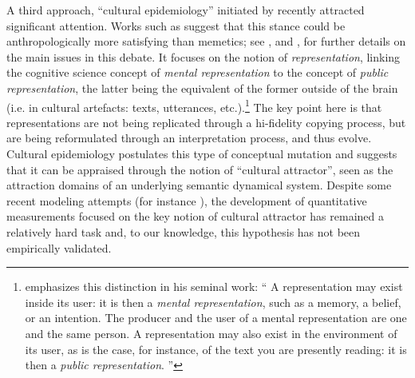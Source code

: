 A third approach, ``cultural epidemiology'' initiated by \citet{sper:expl} recently attracted significant attention. Works such as \citet{Atran03} suggest that this stance could be anthropologically more satisfying than memetics; see \citet{Kuper00}, and \citet{Bloch00}, for further details on the main issues in this debate.
It focuses on the notion of \emph{representation}, linking the cognitive science concept of \emph{mental representation} to the concept of \emph{public representation}, the latter being the equivalent of the former outside of the brain (\hbox{i.e.} in cultural artefacts: texts, utterances, etc.).\footnote{\citet{sper:expl} emphasizes this distinction in his seminal work:
{%
``%
A representation may exist inside its user: it is then a \emph{mental representation}, such as a memory, a belief, or an intention. The producer and the user of a mental representation are one and the same person.  A representation may also exist in the environment of its user, as is the case, for instance, of the text you are presently reading: it is then a \emph{public representation}.}%
''
}
The key point here is that representations are not being replicated through a hi-fidelity copying process, but are being reformulated through an interpretation process, and thus evolve. Cultural epidemiology postulates this type of conceptual mutation and suggests that it can be appraised through the notion of ``cultural attractor'', seen as the attraction domains of an underlying semantic dynamical system.
Despite some recent modeling attempts (for instance \citet{Claidiere07}), the development of quantitative measurements focused on the key notion of cultural attractor has remained a relatively hard task and, to our knowledge, this hypothesis has not been empirically validated.


